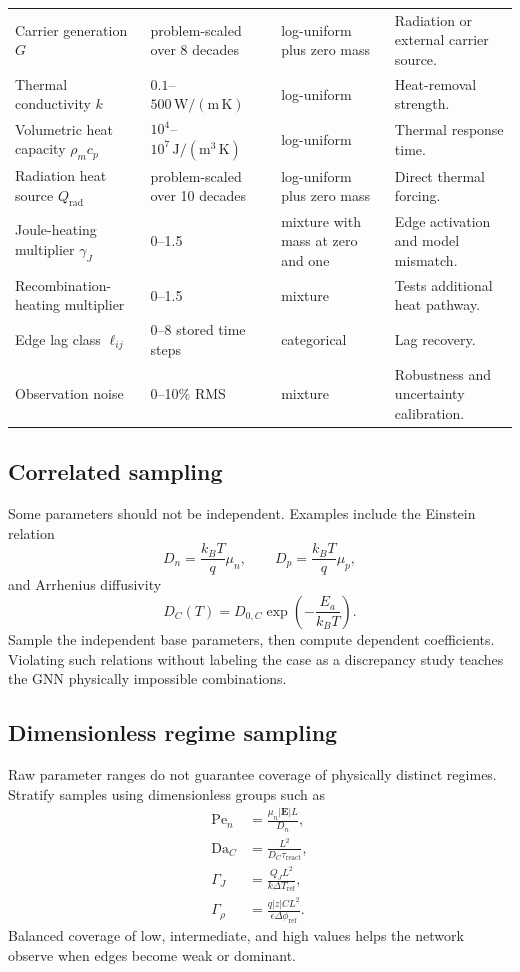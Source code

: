 \documentclass[11pt]{article}
\newcommand{\Evec}{\bm{E}}
\newcommand{\Pe}{\mathrm{Pe}}
\newcommand{\Da}{\mathrm{Da}}
\begin{document}
\begin{longtable}{p{}p{}p{}p{}}
Carrier generation \(G\) & problem-scaled over 8 decades & log-uniform plus zero mass & Radiation or external carrier source. \\
Thermal conductivity \(k\) & \(0.1\)--\(500\,\mathrm{W/(m\,K)}\) & log-uniform & Heat-removal strength. \\
Volumetric heat capacity \(\rho_m c_p\) & \(10^{4}\)--\(10^{7}\,\mathrm{J/(m^3\,K)}\) & log-uniform & Thermal response time. \\
Radiation heat source \(Q_{\mathrm{rad}}\) & problem-scaled over 10 decades & log-uniform plus zero mass & Direct thermal forcing. \\
Joule-heating multiplier \(\gamma_J\) & \(0\)--1.5 & mixture with mass at zero and one & Edge activation and model mismatch. \\
Recombination-heating multiplier & \(0\)--1.5 & mixture & Tests additional heat pathway. \\
Edge lag class \(\ell_{ij}\) & \(0\)--8 stored time steps & categorical & Lag recovery. \\
Observation noise & 0--10\% RMS & mixture & Robustness and uncertainty calibration. \\
\bottomrule
\end{longtable}
\normalsize

\subsection{Correlated sampling}

Some parameters should not be independent. Examples include the Einstein relation
\begin{equation}
D_n=\frac{k_BT}{q}\mu_n,\qquad D_p=\frac{k_BT}{q}\mu_p,
\end{equation}
and Arrhenius diffusivity
\begin{equation}
D_C(T)=D_{0,C}\exp\left(-\frac{E_a}{k_BT}\right).
\end{equation}
Sample the independent base parameters, then compute dependent coefficients. Violating such relations without labeling the case as a discrepancy study teaches the GNN physically impossible combinations.

\subsection{Dimensionless regime sampling}

Raw parameter ranges do not guarantee coverage of physically distinct regimes. Stratify samples using dimensionless groups such as
\begin{align}
\Pe_n&=\frac{\mu_n |\Evec|L}{D_n},\\
\Da_C&=\frac{L^2}{D_C\tau_{\mathrm{react}}},\\
\Gamma_J&=\frac{Q_JL^2}{k\Delta T_{\mathrm{ref}}},\\
\Gamma_\rho&=\frac{q|z|C L^2}{\epsilon\Delta\phi_{\mathrm{ref}}}.
\end{align}
Balanced coverage of low, intermediate, and high values helps the network observe when edges become weak or dominant.
\end{document}
